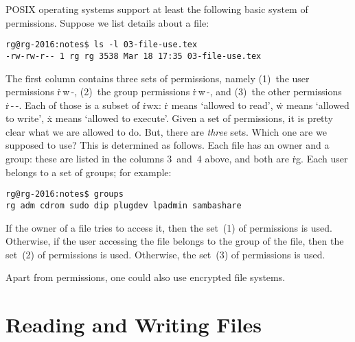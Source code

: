 POSIX operating systems support at least the following basic system of permissions.
Suppose we list details about a file:
\begin{verbatim}
rg@rg-2016:notes$ ls -l 03-file-use.tex
-rw-rw-r-- 1 rg rg 3538 Mar 18 17:35 03-file-use.tex
\end{verbatim}
The first column contains three sets of permissions, namely
  (1)~the user permissions \hbox{\.{r\,w\,-}},
  (2)~the group permissions \hbox{\.{r\,w\,-}}, and
  (3)~the other permissions \hbox{\.{r\,-\,-}}.
Each of those is a subset of \.{rwx}:
  \.{r} means `allowed to read',
  \.{w} means `allowed to write',
  \.{x} means `allowed to execute'.
Given a set of permissions, it is pretty clear what we are allowed to do.
But, there are \emph{three} sets.
Which one are we supposed to use?
This is determined as follows.
Each file has an owner and a group:
  these are listed in the columns 3~and~4 above, and both are \.{rg}.
Each user belongs to a set of groups; for example:
\begin{verbatim}
rg@rg-2016:notes$ groups
rg adm cdrom sudo dip plugdev lpadmin sambashare
\end{verbatim}
If the owner of a file tries to access it,
  then the set~(1) of permissions is used.
Otherwise, if the user accessing the file belongs to the group of the file,
  then the set~(2) of permissions is used.
Otherwise, the set~(3) of permissions is used.

\smallskip

Apart from permissions, one could also use encrypted file systems.


\section{Reading and Writing Files}

